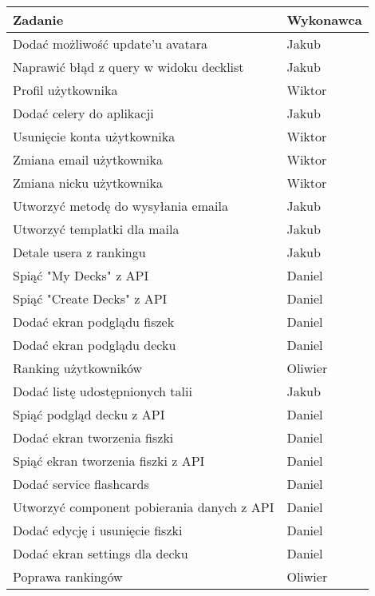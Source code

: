 \begin{longtable}{|p{}|p{}|}
    \hline
    \textbf{Zadanie} & \textbf{Wykonawca} \\
    \hline
    [MOBILE] Dodać możliwość update'u avatara & Jakub \\
    \hline
    [MOBILE] Naprawić błąd z query w widoku decklist & Jakub \\
    \hline
    [WEB] Profil użytkownika & Wiktor \\
    \hline
    [BACKEND] Dodać celery do aplikacji & Jakub \\
    \hline
    [WEB] Usunięcie konta użytkownika & Wiktor \\
    \hline
    [WEB] Zmiana email użytkownika & Wiktor \\
    \hline
    [WEB] Zmiana nicku użytkownika & Wiktor \\
    \hline
    [BACKEND] Utworzyć metodę do wysyłania emaila & Jakub \\
    \hline
    [BACKEND] Utworzyć templatki dla maila & Jakub \\
    \hline
    [MOBILE] Detale usera z rankingu & Jakub \\
    \hline
    [MOBILE] Spiąć "My Decks" z API & Daniel \\
    \hline
    [MOBILE] Spiąć "Create Decks" z API & Daniel \\
    \hline
    [MOBILE] Dodać ekran podglądu fiszek & Daniel \\
    \hline
    [MOBILE] Dodać ekran podglądu decku & Daniel \\
    \hline
    [WEB] Ranking użytkowników & Oliwier \\
    \hline
    [MOBILE] Dodać listę udostępnionych talii & Jakub \\
    \hline
    [MOBILE] Spiąć podgląd decku z API & Daniel \\
    \hline
    [MOBILE] Dodać ekran tworzenia fiszki & Daniel \\
    \hline
    [MOBILE] Spiąć ekran tworzenia fiszki z API & Daniel \\
    \hline
    [MOBILE] Dodać service flashcards & Daniel \\
    \hline
    [MOBILE] Utworzyć component pobierania danych z API & Daniel \\
    \hline
    [MOBILE] Dodać edycję i usunięcie fiszki & Daniel \\
    \hline
    [MOBILE] Dodać ekran settings dla decku & Daniel \\
    \hline
    [WEB] Poprawa rankingów & Oliwier \\

\end{longtable}
